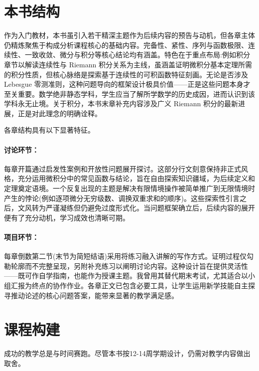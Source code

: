 \section*{本书结构}

作为入门教材，本书虽引入若干精深主题作为后续内容的预告与动机，但各章主体仍精炼聚焦于构成分析课程核心的基础内容。完备性、紧性、序列与函数极限、连续性、一致收敛、微分与积分等核心结论均有涵盖。特色在于重点布局:例如积分章节以解读连续性与 Riemann 积分关系为主线，虽涵盖证明微积分基本定理所需的积分性质，但核心脉络是探索基于连续性的可积函数特征刻画。无论是否涉及Lebesgue 零测准则，这种问题导向的框架设计极具价值——正是这些问题本身才至关重要。数学绝非静态学科，学生应当了解所学数学的历史成因，进而认识到该学科永无止境。关于积分，本书末章补充内容涉及广义 Riemann 积分的最新进展，正是对此理念的明确诠释。

各章结构具有以下显著特征。

\paragraph{讨论环节：}每章开篇通过启发性案例和开放性问题展开探讨。这部分行文刻意保持非正式风格，充分运用微积分中的常见函数与结论，旨在自由探索知识疆域，为后续定义和定理奠定语境。一个反复出现的主题是解决有限情境操作被简单推广到无限情境时产生的悖论(例如逐项微分无穷级数、调换双重求和的顺序)。这些探索性引言之后，文风转为严谨凝练但仍避免过度形式化。当问题框架确立后，后续内容的展开便有了充分动机，学习成效也清晰可期。

\paragraph{项目环节：}每章倒数第二节(末节为简短结语)采用将练习融入讲解的写作方式。证明过程仅勾勒轮廓而不完整呈现，另附补充练习以阐明讨论内容。这种设计旨在提供灵活性——既可作自学指南，也能作为授课主题。我曾用其替代期末考试，尤其适合以小组汇报为终点的协作作业。各章正文已包含必要工具，让学生运用新学技能自主探寻推动论述的核心问题答案，能带来显著的教学满足感。

\section*{课程构建}

成功的教学总是与时间赛跑。尽管本书按12-14周学期设计，仍需对教学内容做出取舍。

